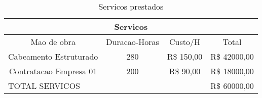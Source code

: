 \begin{table}[h!]
	\centering
	\caption{Servicos prestados}
	\label{tab9} %
\begin{tabular}{|c|c|c|c|}
\hline
\multicolumn{4}{|c|}{Servicos}                                                          \\ \hline
Mao de obra            & Duracao-Horas & Custo/H    & Total                             \\ \hline
Cabeamento Estruturado & 280           & R\$ 150,00 & R\$ 42000,00                      \\ \hline
Contratacao Empresa 01 & 200           & R\$ 90,00  & R\$ 18000,00                      \\ \hline
\multicolumn{3}{|l|}{TOTAL SERVICOS}                & \multicolumn{1}{l|}{R\$ 60000,00} \\ \hline
\end{tabular}
\end{table}









